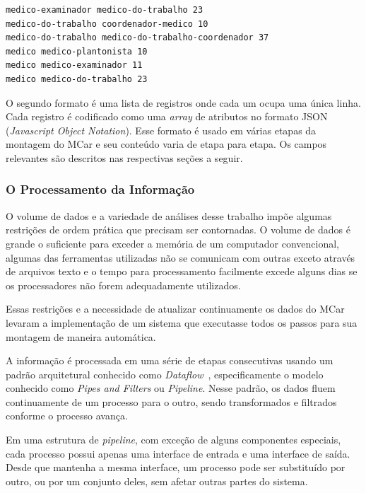 \documentclass[12pt,a4paper]{article}
\theoremstyle{hypo}
\begin{document}
\noindent\begin{minipage}{\linewidth}
\begin{lstlisting}[frame=single,caption=Arquivo em Formato ABC,label=lst:formato-abc,captionpos=b]
medico-examinador medico-do-trabalho 23
medico-do-trabalho coordenador-medico 10
medico-do-trabalho medico-do-trabalho-coordenador 37
medico medico-plantonista 10
medico medico-examinador 11
medico medico-do-trabalho 23
\end{lstlisting}
\end{minipage}

O segundo formato é uma lista de registros onde cada um ocupa uma única linha. Cada registro é codificado como uma \textit{array} de atributos no formato JSON (\textit{Javascript Object Notation}). Esse formato é usado em várias etapas da montagem do MCar e seu conteúdo varia de etapa para etapa. Os campos relevantes são descritos nas respectivas seções a seguir.

\subsubsection{O Processamento da Informação}

O volume de dados e a variedade de análises desse trabalho impõe algumas restrições de ordem prática que precisam ser contornadas. O volume de dados é grande o suficiente para exceder a memória de um computador convencional, algumas das ferramentas utilizadas não se comunicam com outras exceto através de arquivos texto e o tempo para processamento facilmente excede alguns dias se os processadores não forem adequadamente utilizados.

Essas restrições e a necessidade de atualizar continuamente os dados do MCar levaram a implementação de um sistema que executasse todos os passos para sua montagem de maneira automática.

A informação é processada em uma série de etapas consecutivas usando um padrão arquitetural conhecido como \textit{Dataflow}~\cite{Carkci2014-jk, Hohpe2003-nj}, especificamente o modelo conhecido como \textit{Pipes and Filters} ou \textit{Pipeline}. Nesse padrão, os dados fluem continuamente de um processo para o outro, sendo transformados e filtrados conforme o processo avança. 

Em uma estrutura de \textit{pipeline}, com exceção de alguns componentes especiais, cada processo possui apenas uma interface de entrada e uma interface de saída. Desde que mantenha a mesma interface, um processo pode ser substituído por outro, ou por um conjunto deles, sem afetar outras partes do sistema.
\end{document}
